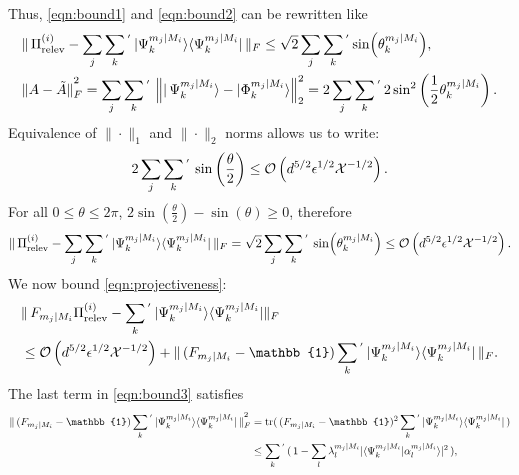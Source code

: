 Thus, \ref{eqn:bound1} and \ref{eqn:bound2} can be rewritten like
\begin{align*}
& \|\thinspace\Pi_{\text{relev}}^{(i)}-\sum_j\sum_k{}^{'}\thinspace\vert \Psi_k^{m_j\vert M_i}\rangle \langle \Psi_k^{m_j\vert M_i}\vert \thinspace\|_F\leq\sqrt{2}\sum_j\sum_k{}^{'}\sin(\theta_k^{m_j\vert M_i}), \\
& \|A-\Tilde{A}\|_F^{\textstyle ^2}=\sum_j\sum_k{}^{'}\thinspace\left\|\vert\thinspace \Psi_k^{m_j\vert M_i} \rangle - \vert \Phi_k^{m_j\vert M_i}\rangle\right\|_2^2=2\sum_j\sum_k{}^{'}\thinspace 2\sin^2\left(\frac{1}{2}\theta_k^{m_j\vert M_i}\right).
\end{align*}
Equivalence of $\|\cdot\|_1$ and $\|\cdot\|_2$ norms allows us to write:
\begin{equation*}
2\sum_j\sum_k{}^{'}\thinspace\sin\left(\frac{\theta}{2}\right)\leq \mathcal{O}\left(d^{5/2}\epsilon^{1/2}\mathcal{X}^{-1/2}\right).
\end{equation*}
For all $0\leq \theta \leq 2\pi$, $2\sin(\frac{\theta}{2})-\sin(\theta)\geq 0$, therefore
\begin{equation}
\label{eqn:projvsstates}
\|\thinspace\Pi_{\text{relev}}^{(i)}-\sum_j\sum_k{}^{'}\thinspace\vert \Psi_k^{m_j\vert M_i}\rangle \langle \Psi_k^{m_j\vert M_i}\vert \thinspace\|_F = \sqrt{2}\sum_j\sum_k{}^{'}\thinspace\sin(\theta_k^{m_j\vert M_i})\leq\mathcal{O}\left(d^{5/2}\epsilon^{1/2}\mathcal{X}^{-1/2}\right).
\end{equation}
We now bound \ref{eqn:projectiveness}:
\begin{equation}
\label{eqn:bound3}
\begin{split}
& \|\thinspace F_{m_j\vert M_i}\Pi_{\text{relev}}^{(i)}-\sum_{k}{}^{'}\thinspace\vert \Psi_k^{m_j\vert M_i}\rangle \langle \Psi_k^{m_j\vert M_i}\vert \|_F \\ & \leq \mathcal{O}\left(d^{5/2}\epsilon^{1/2}\mathcal{X}^{-1/2}\right)+\|\thinspace(F_{m_j\vert M_i}-\mathbb{1})\sum_k{}^{'}\thinspace\vert \Psi_k^{m_j\vert M_i} \rangle \langle \Psi_k^{m_j\vert M_i} \vert \thinspace\|_F.
\end{split}
\end{equation}
The last term in \ref{eqn:bound3} satisfies
\begin{equation*}
\begin{split}
\|\thinspace(F_{m_j\vert M_i}-\mathbb{1})\sum_k{}^{'}\thinspace\vert \Psi_k^{m_j\vert M_i} \rangle \langle \Psi_k^{m_j\vert M_i} \vert\thinspace \|_F^{\textstyle ^2} & =\operatorname{tr}(\thinspace(F_{m_j\vert M_i}-\mathbb{1})^2\sum_k{}^{'}\thinspace\vert \Psi_k^{m_j\vert M_i} \rangle \langle \Psi_k^{m_j\vert M_i} \vert\thinspace) \\
& \leq \sum_k{}^{'}\thinspace(\thinspace 1-\sum_l \lambda_l^{m_j\vert M_i}\vert \langle \Psi_k^{m_j\vert M_i}\vert \alpha_l^{m_j\vert M_i}\rangle \vert ^2\thinspace),
\end{split}
\end{equation*}
